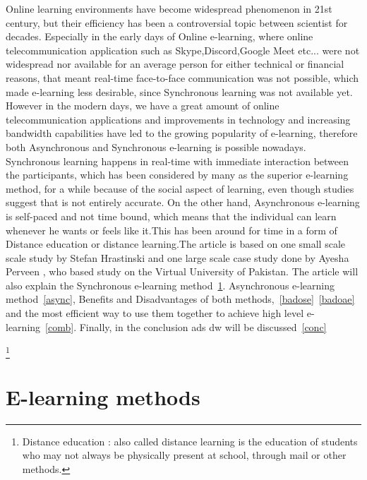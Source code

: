 \documentclass[10pt,twoside,english,a4paper]{article}
\begin{document}
Online learning environments have become widespread phenomenon in 21st century, but their efficiency has been a controversial topic between scientist for decades. Especially in the early days of Online e-learning, where online telecommunication application such as Skype,Discord,Google Meet etc... were not widespread nor available for an average person for either technical or financial reasons,  that meant real-time face-to-face communication was not possible, which made e-learning less desirable, since Synchronous learning was not available yet. However in the modern days, we have a great amount of online telecommunication applications and improvements in technology and increasing bandwidth capabilities have led to the growing popularity of e-learning, therefore both Asynchronous and Synchronous e-learning is possible nowadays.
Synchronous learning happens in real-time with immediate interaction between the participants, which has been considered by many as the superior e-learning method, for a while because of the social aspect of learning, even though studies suggest that is not entirely accurate.
On the other hand, Asynchronous e-learning is self-paced and not time bound, which means that the individual can learn whenever he wants or feels like it.This has been around for time in a form of Distance education or distance learning.The article is based on one small scale scale study by Stefan Hrastinski and one large scale case study done by Ayesha Perveen , who based study on the Virtual University of Pakistan. The article will also explain the Synchronous e-learning method~\ref{sync}.
Asynchronous e-learning method~\ref{async}, Benefits and Disadvantages of both methods,~\ref{badose}~\ref{badoae}
and the most efficient way to use them together to achieve high level e-learning~\ref{comb}. 
Finally, in the conclusion ads dw will be discussed~\ref{conc}

\footnote{Distance education : also called distance learning is the education of students who may not always be physically present at school, through mail or other methods.}





\section{E-learning methods} \label{sync}
\end{document}
